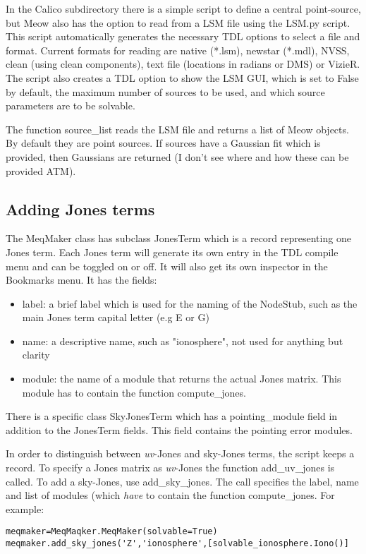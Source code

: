 \documentclass[11pt]{article}
\begin{document}
In the Calico subdirectory there is a simple script to define a central point-source, but Meow also has the option to read from a LSM file using the LSM.py script. This script automatically generates the necessary TDL options to select a file and format. Current formats for reading are native (*.lsm), newstar (*.mdl), NVSS, clean (using clean components), text file (locations in radians or DMS) or VizieR. The script also creates a TDL option to show the LSM GUI, which is set to False by default, the maximum number of sources to be used, and which source parameters are to be solvable.

The function source\_list reads the LSM file and returns a list of Meow objects. By default they are point sources. If sources have a Gaussian fit which is provided, then Gaussians are returned (I don't see where and how these can be provided ATM).

\subsection{Adding Jones terms}
The MeqMaker class has subclass JonesTerm which is a record representing one Jones term. Each Jones term will generate its own entry in the TDL compile menu and can be toggled on or off. It will also get its own inspector in the Bookmarks menu. It has the fields:
\begin{itemize}
\item label: a brief label which is used for the naming of the NodeStub, such as the main Jones term capital letter (e.g E or G)
\item name: a descriptive name, such as "ionosphere", not used for anything but clarity
\item module: the name of a module that returns the actual Jones matrix. This module has to contain the function compute\_jones.
\end{itemize}
There is a specific class SkyJonesTerm which has a pointing\_module field in addition to the JonesTerm fields. This field contains the pointing error modules. 

In order to distinguish between {\it uv}-Jones and sky-Jones terms, the script keeps a record. To specify a Jones matrix as {\it uv}-Jones the function add\_uv\_jones is called. To add a sky-Jones, use add\_sky\_jones.
The call specifies the label, name and list of modules (which {\em have} to contain the function compute\_jones. For example:
\begin{verbatim}
meqmaker=MeqMaqker.MeqMaker(solvable=True)
meqmaker.add_sky_jones('Z','ionosphere',[solvable_ionosphere.Iono()]
\end{verbatim}
\end{document}
